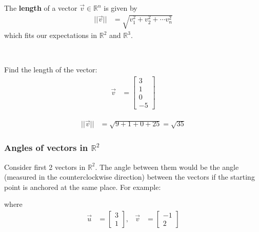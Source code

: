 \begin{definition}
The \textbf{length} of a vector  $\vec{v} \in \mathbb{R}^n$ is given by 
%
\begin{align*}
|| \vec{v}|| & = \sqrt{v_1^2 + v_2^2 + \cdots v_n^2 } 
\end{align*}
which fits our expectations in $\mathbb{R}^2$ and $\mathbb{R}^3$.  
\end{definition}

\phantom{some text that doesn't show.}

~

\begin{example}
Find the length of the vector:
%
\begin{align*}
\vec{v}& = \begin{bmatrix}
3 \\ 1 \\ 0 \\ -5 
\end{bmatrix}
\end{align*}

\solution

\begin{align*}
||\vec{v}|| & = \sqrt{9+1+0+25} = \sqrt{35} 
\end{align*}
\end{example}

\subsubsection{Angles of vectors in $\mathbb{R}^2$} 

Consider first 2 vectors in $\mathbb{R}^2$.  The angle between them would be the angle (measured in the counterclockwise direction) between the vectors if the starting point is anchored at the same place.   For example:


\begin{center}
\end{center}
where 
%
\begin{align*}
\vec{u} & = \begin{bmatrix}
3 \\ 1
\end{bmatrix}, & \vec{v} & = \begin{bmatrix}
-1 \\ 2 
\end{bmatrix}
\end{align*}

